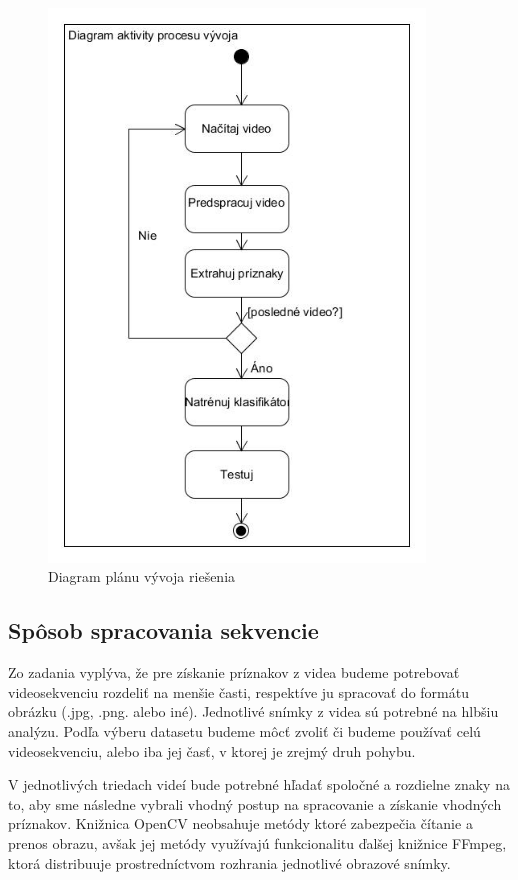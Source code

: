 \begin{figure}[H]
  \centering
  \includegraphics[width=10cm]{img/actTrenovanieKlasifikatora.jpg}
  \caption{Diagram plánu vývoja riešenia}
  \label{UML1}
\end{figure}

\subsection{Spôsob spracovania sekvencie}
Zo zadania vyplýva, že pre získanie príznakov z videa budeme potrebovať videosekvenciu rozdeliť na menšie časti, respektíve ju spracovať do formátu obrázku (.jpg, .png. alebo iné). Jednotlivé snímky z videa sú potrebné na hlbšiu analýzu. Podľa výberu datasetu budeme môcť zvoliť či budeme používať celú videosekvenciu, alebo iba jej časť, v ktorej je zrejmý druh pohybu. 

V jednotlivých triedach videí bude potrebné hľadať spoločné a rozdielne znaky na to, aby sme následne vybrali vhodný postup na spracovanie a získanie vhodných príznakov. Knižnica OpenCV neobsahuje metódy ktoré zabezpečia čítanie a prenos obrazu, avšak jej metódy využívajú funkcionalitu ďalšej knižnice FFmpeg, ktorá distribuuje prostredníctvom rozhrania jednotlivé obrazové snímky. 


